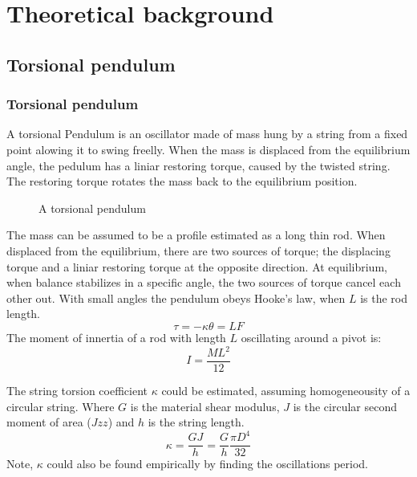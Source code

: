 \documentclass[\main/master.tex]{subfiles}
\begin{document}
\chapter{Theoretical background}\label{chp:example-2}


\section{Torsional pendulum}
\subsection{Torsional pendulum}
A torsional Pendulum is an oscillator made of mass hung by a string from a fixed point alowing it to swing freelly. When the mass is displaced from the equilibrium angle, the pedulum has a liniar restoring torque, caused by the twisted string. The restoring torque rotates the mass back to the equilibrium position.


\begin{figure}[htbp]
	\centering
	\caption[Torsional pendulum]{A torsional pendulum}
	\label{fig:torsion_pendulum}
\end{figure}
\par\noindent
The mass can be assumed to be a profile estimated as a long thin rod. When displaced from the equilibrium, there are two sources of torque; the displacing torque and a liniar restoring torque at the opposite direction. At equilibrium, when balance stabilizes in a specific angle, the two sources of torque cancel each other out. With small angles the pendulum obeys Hooke’s law, when $L$ is the rod length.
\begin{equation}
\tau = -\kappa\theta = LF    \label{eqn:Hooke_law}
\end{equation}
The moment of innertia of a rod with length $L$ oscillating around a pivot is:
\begin{equation}
I = \frac{ML^2}{12}     \label{eqn:moment_innertia}
\end{equation}  

\noindent
The string torsion coefficient $\kappa $ could be estimated, assuming homogeneousity of a circular string. Where $G$ is the material shear modulus, $J$ is the circular second moment of area ($Jzz$) and $h$ is the string length.
\begin{equation}
\kappa = \frac{GJ}{h} = \frac{G}{h} \frac{\pi D^4}{32}    \label{eqn:torsion_coefficient}
\end{equation}
Note, $\kappa$ could also be found empirically by finding  the  oscillations period.
 
\end{document}
